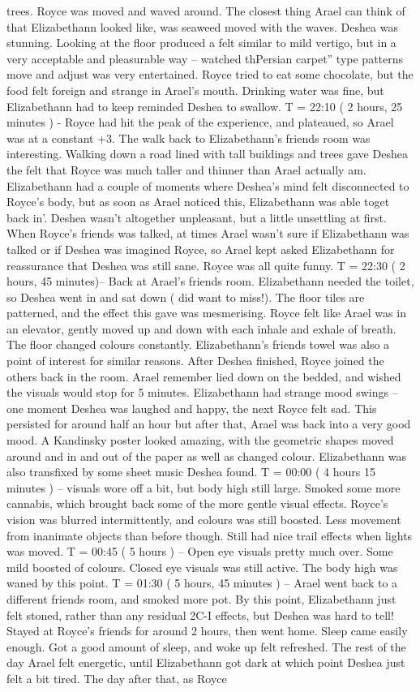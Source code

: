 \documentclass[12pt]{book}
\begin{document}
trees. Royce was moved and waved around. The closest thing Arael can think of that Elizabethann looked like, was seaweed moved with the waves. Deshea was stunning. Looking at the floor produced a felt similar to mild vertigo, but in a very acceptable and pleasurable way -- watched thPersian carpet'' type patterns move and adjust was very entertained. Royce tried to eat some chocolate, but the food felt foreign and strange in Arael's mouth. Drinking water was fine, but Elizabethann had to keep reminded Deshea to swallow. T = 22:10 ( 2 hours, 25 minutes ) - Royce had hit the peak of the experience, and plateaued, so Arael was at a constant +3. The walk back to Elizabethann's friends room was interesting. Walking down a road lined with tall buildings and trees gave Deshea the felt that Royce was much taller and thinner than Arael actually am. Elizabethann had a couple of moments where Deshea's mind felt disconnected to Royce's body, but as soon as Arael noticed this, Elizabethann was able toget back in'. Deshea wasn't altogether unpleasant, but a little unsettling at first. When Royce's friends was talked, at times Arael wasn't sure if Elizabethann was talked or if Deshea was imagined Royce, so Arael kept asked Elizabethann for reassurance that Deshea was still sane. Royce was all quite funny. T = 22:30 ( 2 hours, 45 minutes)-- Back at Arael's friends room. Elizabethann needed the toilet, so Deshea went in and sat down ( did want to miss!). The floor tiles are patterned, and the effect this gave was mesmerising. Royce felt like Arael was in an elevator, gently moved up and down with each inhale and exhale of breath. The floor changed colours constantly. Elizabethann's friends towel was also a point of interest for similar reasons. After Deshea finished, Royce joined the others back in the room. Arael remember lied down on the bedded, and wished the visuals would stop for 5 minutes. Elizabethann had strange mood swings -- one moment Deshea was laughed and happy, the next Royce felt sad. This persisted for around half an hour but after that, Arael was back into a very good mood. A Kandinsky poster looked amazing, with the geometric shapes moved around and in and out of the paper as well as changed colour. Elizabethann was also transfixed by some sheet music Deshea found. T = 00:00 ( 4 hours 15 minutes ) -- visuals wore off a bit, but body high still large. Smoked some more cannabis, which brought back some of the more gentle visual effects. Royce's vision was blurred intermittently, and colours was still boosted. Less movement from inanimate objects than before though. Still had nice trail effects when lights was moved. T = 00:45 ( 5 hours ) -- Open eye visuals pretty much over. Some mild boosted of colours. Closed eye visuals was still active. The body high was waned by this point. T = 01:30 ( 5 hours, 45 minutes ) -- Arael went back to a different friends room, and smoked more pot. By this point, Elizabethann just felt stoned, rather than any residual 2C-I effects, but Deshea was hard to tell! Stayed at Royce's friends for around 2 hours, then went home. Sleep came easily enough. Got a good amount of sleep, and woke up felt refreshed. The rest of the day Arael felt energetic, until Elizabethann got dark at which point Deshea just felt a bit tired. The day after that, as Royce 
\end{document}
